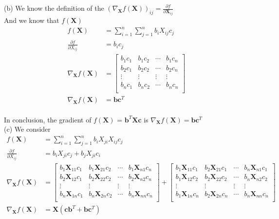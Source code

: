 \documentclass[a4paper,12pt]{article}
\begin{document}
(b) 
We know the definition of the \((\nabla_{\bm{X}} f(\bm{X}))_{ij} = \frac{\partial f}{\partial \bm{X}_{ij}} \) \\
And we know that \(f(\bm{X})\)
\begin{align*}
    f(\bm{X}) &= \sum_{i=1}^{n}\sum_{j=1}^{n} b_iX_{ij}c_j \\
    \frac{\partial f}{\partial X_{ij}} &= b_ic_j \\ 
    \nabla_{\bm{X}} f(\bm{X}) &= \begin{bmatrix}
        b_1c_1 & b_1c_2 & \cdots & b_1c_n \\
        b_2c_1 & b_2c_2 & \cdots & b_2c_n \\
        \vdots &\vdots & \vdots &\vdots \\
        b_nc_1 & b_nc_2 & \cdots & b_nc_n \\
    \end{bmatrix} \\
    \nabla_{\bm{X}} f(\bm{X}) &= \bm{b}\bm{c}^T
\end{align*} \\
In conclusion, the gradient of \(f(\bm{X})\) = \(\bm{b}^T\bm{X}\bm{c}\) is \(\nabla_{\bm{X}} f(\bm{X}) = \bm{b}\bm{c}^T\) \\

(c) We consider\\
\begin{align*}
    f(\bm{X}) &= \sum_{i=1}^{n}\sum_{j=1}^{n} b_iX_{ji}X_{ij}c_j \\
    \frac{\partial f}{\partial X_{ij}} &= b_iX_{ji}c_j + b_jX_{ji}c_i \\ 
    \nabla_{\bm{X}} f(\bm{X}) &= \begin{bmatrix}
        b_1\bm{X}_{11}c_1 & b_1\bm{X}_{21}c_2 & \cdots & b_1\bm{X}_{n1}c_n \\
        b_2\bm{X}_{12}c_1 & b_2\bm{X}_{22}c_2 & \cdots & b_2\bm{X}_{n2}c_n \\
        \vdots &\vdots & \vdots &\vdots \\
        b_n\bm{X}_{1n}c_1 & b_n\bm{X}_{2n}c_2 & \cdots & b_n\bm{X}_{nn}c_n \\
    \end{bmatrix}  + 
    \begin{bmatrix}
        b_1\bm{X}_{11}c_1 & b_2\bm{X}_{21}c_1 & \cdots & b_n\bm{X}_{n1}c_1 \\
        b_1\bm{X}_{12}c_2 & b_2\bm{X}_{22}c_2 & \cdots & b_n\bm{X}_{n2}c_2 \\
        \vdots &\vdots & \vdots &\vdots \\
        b_1\bm{X}_{1n}c_n & b_2\bm{X}_{2n}c_n & \cdots & b_n\bm{X}_{nn}c_n \\
    \end{bmatrix}   \\
    \nabla_{\bm{X}} f(\bm{X}) &= \bm{X}(\bm{c}\bm{b}^T + \bm{b}\bm{c}^T)
\end{align*}
\end{document}
